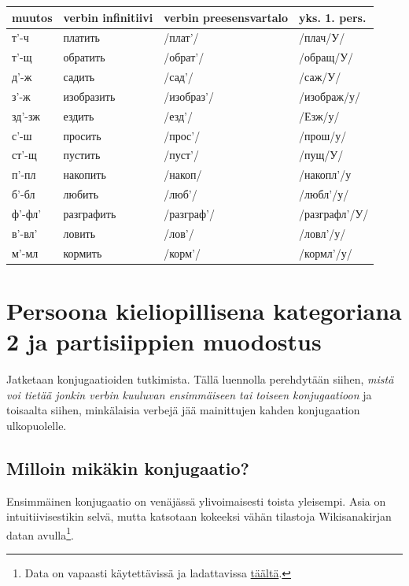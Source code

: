 \documentclass[]{scrreprt}
\begin{document}
\begin{longtable}[c]{@{}llll@{}}
\toprule
muutos & verbin infinitiivi & verbin preesensvartalo & yks. 1.
pers.\tabularnewline
\midrule
\endhead
т'-ч & платить & /плат'/ & /плач/У/\tabularnewline
т'-щ & обратить & /обрат'/ & /обращ/У/\tabularnewline
д'-ж & садить & /сад'/ & /саж/У/\tabularnewline
з'-ж & изобразить & /изобраз'/ & /изображ/у/\tabularnewline
зд'-зж & ездить & /езд'/ & /Езж/у/\tabularnewline
с'-ш & просить & /прос'/ & /прош/у/\tabularnewline
ст'-щ & пустить & /пуст'/ & /пущ/У/\tabularnewline
п'-пл & накопить & /накоп/ & /накопл'/у\tabularnewline
б'-бл & любить & /люб'/ & /любл'/у/\tabularnewline
ф'-фл' & разграфить & /разграф'/ & /разграфл'/У/\tabularnewline
в'-вл' & ловить & /лов'/ & /ловл'/у/\tabularnewline
м'-мл & кормить & /корм'/ & /кормл'/у/\tabularnewline
\bottomrule
\end{longtable}

\chapter{Persoona kieliopillisena kategoriana 2 ja
partisiippien
muodostus}\label{luennot-1213-persoona-kieliopillisena-kategoriana-2-ja-partisiippien-muodostus}


Jatketaan konjugaatioiden tutkimista. Tällä luennolla perehdytään
siihen, \emph{mistä voi tietää jonkin verbin kuuluvan ensimmäiseen tai
toiseen konjugaatioon} ja toisaalta siihen, minkälaisia verbejä jää
mainittujen kahden konjugaation ulkopuolelle.

\section{Milloin mikäkin
konjugaatio?}\label{milloin-mikuxe4kin-konjugaatio}

Ensimmäinen konjugaatio on venäjässä ylivoimaisesti toista yleisempi.
Asia on intuitiivisestikin selvä, mutta katsotaan kokeeksi vähän
tilastoja Wikisanakirjan datan avulla\footnote{Data on vapaasti
  käytettävissä ja ladattavissa
  \href{https://dumps.wikimedia.org/ruwiktionary}{täältä}.}.
\end{document}
